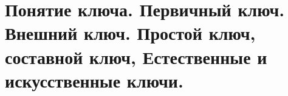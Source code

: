 {
	\section{Понятие ключа. Первичный ключ. Внешний ключ. Простой ключ, составной ключ, Естественные и искусственные ключи.}
	\newpage
}
